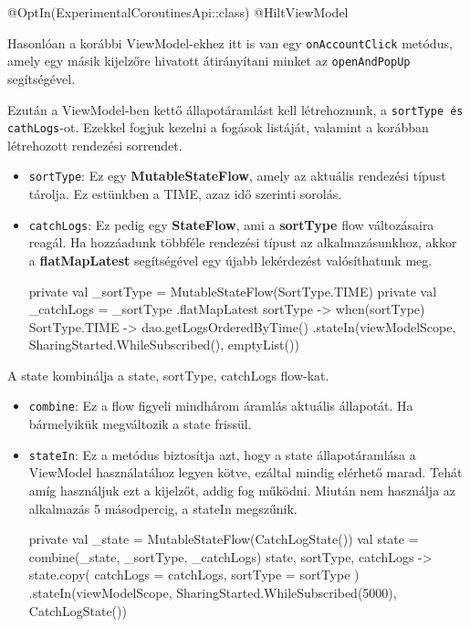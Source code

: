 \begin{java}[caption = {Annotációk szemléletése.}]
@OptIn(ExperimentalCoroutinesApi::class)
@HiltViewModel    
\end{java}

Hasonlóan a korábbi ViewModel-ekhez itt is van egy \texttt{onAccountClick} metódus, amely egy másik kijelzőre hivatott átirányítani minket az \texttt{openAndPopUp} segítségével.

Ezután a ViewModel-ben kettő állapotáramlást kell létrehoznunk, a \texttt{\textunderscore sortType és \textunderscore cathLogs}-ot.
Ezekkel fogjuk kezelni a fogások listáját, valamint a korábban létrehozott rendezési sorrendet.
\begin{itemize}
    \item \texttt{\textunderscore sortType}: Ez egy \textbf{MutableStateFlow}, amely az aktuális rendezési típust tárolja. Ez estünkben a TIME, azaz idő szerinti sorolás.
    \item \texttt{\textunderscore catchLogs}: Ez pedig egy \textbf{StateFlow}, ami a \textbf{\textunderscore sortType} flow változásaira reagál. Ha hozzáadunk többféle rendezési típust az alkalmazásunkhoz, akkor a \textbf{flatMapLatest} segítségével egy újabb lekérdezést valósíthatunk meg.

\newpage

\begin{java}[caption = {A különböző Flow típusok szemléltetése.}]
private val _sortType = MutableStateFlow(SortType.TIME)
private val _catchLogs = _sortType
    .flatMapLatest { sortType ->
        when(sortType) {
            SortType.TIME -> dao.getLogsOrderedByTime()
        }
    }
    .stateIn(viewModelScope,
    SharingStarted.WhileSubscribed(), emptyList())
    
\end{java}
\end{itemize}

 A state kombinálja a \textunderscore state, \textunderscore sortType, \textunderscore catchLogs flow-kat.
 \begin{itemize}
     \item \texttt{combine}: Ez a flow figyeli mindhárom áramlás aktuális állapotát. Ha bármelyikük megváltozik a state frissül.
     \item \texttt{stateIn}: Ez a metódus biztosítja azt, hogy a state állapotáramlása a ViewModel használatához legyen kötve, ezáltal mindig elérhető marad. Tehát amíg használjuk ezt a kijelzőt, addig fog működni. Miután nem használja az alkalmazás 5 másodpercig, a stateIn megszűnik.

\begin{java} [caption = {A combine szemléltetése.}]
private val _state = MutableStateFlow(CatchLogState())
val state = combine(_state, _sortType, _catchLogs)
    { state, sortType, catchLogs ->
    state.copy(
        catchLogs = catchLogs,
        sortType = sortType
    )
}.stateIn(viewModelScope,
SharingStarted.WhileSubscribed(5000),
CatchLogState())

\end{java}
\end{itemize}

